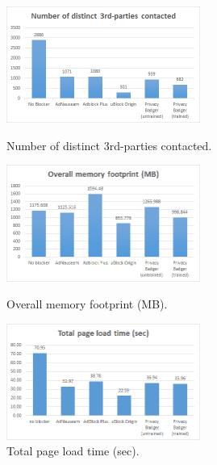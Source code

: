 \documentclass[conference]{IEEEtran}
\begin{document}
\begin{figure}[!t]
\centering
\includegraphics[width=2.5in]{images/thirdparty.png}
\caption{Number of distinct 3rd-parties contacted.}
\label{fig:thirdparty}
\vspace{10mm}
\includegraphics[width=2.5in]{images/memory.png}
\caption{Overall memory footprint (MB).}
\label{fig:memory}
\vspace{10mm}
\includegraphics[width=2.5in]{images/loadtime.png}
\caption{Total page load time (sec).}
\label{fig:loadtime}
\end{figure}
\end{document}
